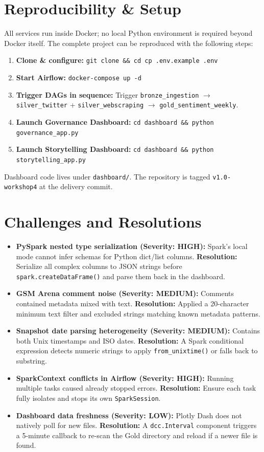 \documentclass[12pt, a4paper]{article}
\begin{document}
\section{Reproducibility \& Setup}
All services run inside Docker; no local Python environment is required beyond Docker itself. The complete project can be reproduced with the following steps:

\begin{enumerate}
    \item \textbf{Clone \& configure:} \texttt{git clone \&\& cd cp .env.example .env}
    \item \textbf{Start Airflow:} \texttt{docker-compose up -d}
    \item \textbf{Trigger DAGs in sequence:} Trigger \texttt{bronze\_ingestion} $\rightarrow$ \texttt{silver\_twitter} + \texttt{silver\_webscraping} $\rightarrow$ \texttt{gold\_sentiment\_weekly}.
    \item \textbf{Launch Governance Dashboard:} \texttt{cd dashboard \&\& python governance\_app.py}
    \item \textbf{Launch Storytelling Dashboard:} \texttt{cd dashboard \&\& python storytelling\_app.py}
\end{enumerate}
Dashboard code lives under \texttt{dashboard/}. The repository is tagged \texttt{v1.0-workshop4} at the delivery commit.

\section{Challenges and Resolutions}
\begin{itemize}
    \item \textbf{PySpark nested type serialization (Severity: HIGH):} Spark's local mode cannot infer schemas for Python dict/list columns. \textbf{Resolution:} Serialize all complex columns to JSON strings before \texttt{spark.createDataFrame()} and parse them back in the dashboard.
    \item \textbf{GSM Arena comment noise (Severity: MEDIUM):} Comments contained metadata mixed with text. \textbf{Resolution:} Applied a 20-character minimum text filter and excluded strings matching known metadata patterns.
    \item \textbf{Snapshot date parsing heterogeneity (Severity: MEDIUM):} Contains both Unix timestamps and ISO dates. \textbf{Resolution:} A Spark conditional expression detects numeric strings to apply \texttt{from\_unixtime()} or falls back to substring.
    \item \textbf{SparkContext conflicts in Airflow (Severity: HIGH):} Running multiple tasks caused already stopped errors. \textbf{Resolution:} Ensure each task fully isolates and stops its own \texttt{SparkSession}.
    \item \textbf{Dashboard data freshness (Severity: LOW):} Plotly Dash does not natively poll for new files. \textbf{Resolution:} A \texttt{dcc.Interval} component triggers a 5-minute callback to re-scan the Gold directory and reload if a newer file is found.
\end{itemize}
\end{document}
